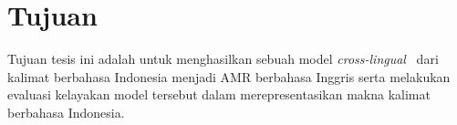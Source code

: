 \section{Tujuan}

Tujuan tesis ini adalah untuk menghasilkan sebuah model \textit{cross-lingual} \amrparsing~dari kalimat berbahasa Indonesia menjadi \gls{AMR} berbahasa Inggris serta melakukan evaluasi kelayakan model tersebut dalam merepresentasikan makna kalimat berbahasa Indonesia.
